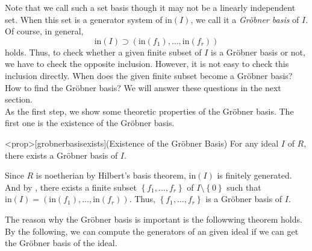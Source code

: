 \documentclass{article}
\begin{document}
Note that we call such a set basis though it may not be a linearly independent set. When this set is a generator system of $\mathrm{in}(I)$, we call it a \textit{Gr\"{o}bner basis} of $I$.\\ 
Of course, in general, $$\mathrm{in}(I) \supset \left( \mathrm{in}(f_1), \ldots, \mathrm{in}(f_r) \right)$$ holds. Thus, to check whether a given finite subset of $I$ is a Gr\"{o}bner basis or not, we have to check the opposite inclusion. However, it is not easy to check this inclusion directly. When does the given finite subset become a Gr\"{o}bner basis? How to find the Gr\"{o}bner basis? We will answer these questions in the next section.\\ 
As the first step, we show some theoretic properties of the Gr\"{o}bner basis. The first one is the existence of the Gr\"{o}bner basis.

\begin{statementsp}<prop>[grobnerbasisexists](Existence of the Gr\"{o}bner Basis)
    For any ideal $I$ of $R$, there exists a Gr\"{o}bner basis of $I$.
\end{statementsp}
\begin{pfsp}
    Since $R$ is noetherian by Hilbert's basis theorem, $\mathrm{in}(I)$ is finitely generated. And by , there exists a finite subset $\left\{ f_1, \ldots, f_r \right\}$ of $I \setminus \left\{ 0 \right\}$ such that $\mathrm{in}(I) = \left( \mathrm{in}(f_1), \ldots, \mathrm{in}(f_r) \right)$. Thus, $\left\{ f_1, \ldots, f_r \right\}$ is a Gr\"{o}bner basis of $I$.
\end{pfsp}

The reason why the Gr\"{o}bner basis is important is the followwing theorem holds. By the following, we can compute the generators of an given ideal if we can get the Gr\"{o}bner basis of the ideal.
\end{document}

